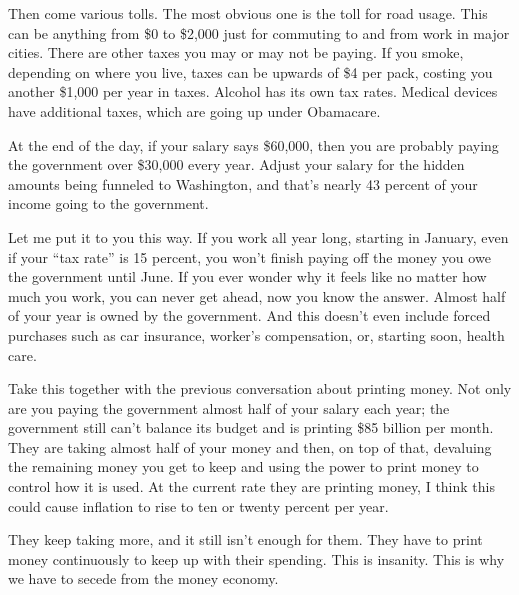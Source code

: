 Then come various
tolls. The most obvious one is the toll for road usage. This can be
anything from \$0 to \$2,000 just for commuting to and from work in
major cities.  There are other taxes you may or may not be paying. If
you smoke, depending on where you live, taxes can be upwards of \$4 per
pack, costing you another \$1,000 per year in taxes. Alcohol has its
own tax rates. Medical devices have additional taxes, which are going
up under Obamacare.

At the end of the day, if your salary says \$60,000, then you are
probably paying the government over \$30,000 every year. Adjust your
salary for the hidden amounts being funneled to Washington, and that’s
nearly 43 percent of your income going to the government.

Let me put it to you this way. If you work all year long, starting in
January, even if your “tax rate” is 15 percent, you won’t finish paying
off the money you owe the government until June. If you ever wonder why
it feels like no matter how much you work, you can never get ahead, now
you know the answer. Almost half of your year is owned by the
government. And this doesn’t even include forced purchases such as car
insurance, worker’s compensation, or, starting soon, health care.

Take this together with the previous conversation about printing money.
Not only are you paying the government almost half of your salary each
year; the government still can’t balance its budget and is printing
\$85 billion per month. They are taking almost half of your money and
then, on top of that, devaluing the remaining money you get to keep
and using the power to print money to control how it is used. At the current rate
they are printing money, I think this could cause inflation to rise to ten or
twenty percent per year. 

They keep taking more, and it still isn't enough for them. They have to print
money continuously to keep up with their spending. This is insanity. This is why we have to
secede from the money economy.

